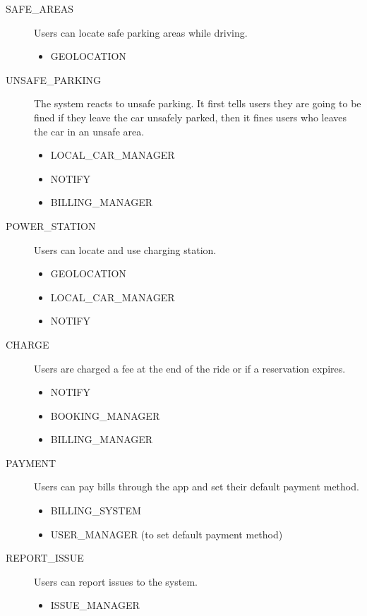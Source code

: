 \documentclass[11pt]{article} %
\begin{document}
\begin{description}
	\item[SAFE\_AREAS] Users can locate safe parking areas while driving.
		\begin{itemize}
			\item GEOLOCATION
		\end{itemize}

	\item[UNSAFE\_PARKING] The system reacts to unsafe parking. It first tells users they are going to be fined if they leave the car unsafely parked, then it fines users who leaves the car in an unsafe area.
		\begin{itemize}
			\item LOCAL\_CAR\_MANAGER
			\item NOTIFY
			\item BILLING\_MANAGER
		\end{itemize}

	\item[POWER\_STATION] Users can locate and use charging station.
		\begin{itemize}
			\item GEOLOCATION
			\item LOCAL\_CAR\_MANAGER
			\item NOTIFY
		\end{itemize}

	\item[CHARGE] Users are charged a fee at the end of the ride or if a reservation expires.
		\begin{itemize}
			\item NOTIFY
			\item BOOKING\_MANAGER
			\item BILLING\_MANAGER
		\end{itemize}

	\item[PAYMENT] Users can pay bills through the app and set their default payment method.
		\begin{itemize}
			\item BILLING\_SYSTEM
			\item USER\_MANAGER (to set default payment method)
		\end{itemize}

	\item[REPORT\_ISSUE] Users can report issues to the system.
		\begin{itemize}
			\item ISSUE\_MANAGER
		\end{itemize}


\end{description}
\end{document}
